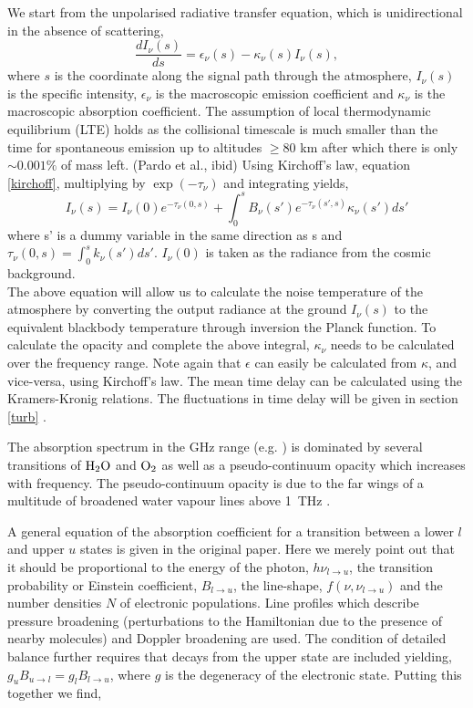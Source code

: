 We start from the unpolarised radiative transfer equation, which is unidirectional in the absence of scattering,
\begin{equation}
\frac{dI_\nu (s) }{ds} = \epsilon_\nu(s) -\kappa_\nu(s)  I_\nu (s),
\end{equation}\label{eq:rad_trans}
where $s$ is the coordinate along the signal path through the atmosphere, $I_\nu(s)$ is the specific intensity, $\epsilon_\nu$ is the macroscopic emission coefficient and $\kappa_\nu$ is the macroscopic absorption coefficient.  The assumption of local thermodynamic equilibrium (LTE) holds as the collisional timescale is much smaller than the time for spontaneous emission up to altitudes $\ge 80$ km after which there is only $\sim 0.001\%$ of mass left. (Pardo et al., ibid) Using Kirchoff's law, equation \ref{kirchoff}, multiplying by $\exp(-\tau_\nu)$ and integrating yields, 
\begin{equation}
I_\nu(s) = I_\nu(0) e^{-\tau_\nu (0,s) }+ \int_0^s B_\nu(s')e^{-\tau_\nu (s',s) }\kappa_\nu(s')ds'
\end{equation}
where  s' is a dummy variable in the same direction as s and $\tau_\nu (0,s) = \int_0^{s} k_\nu(s')ds'$. $I_\nu(0)$ is taken as the radiance from the cosmic background.\\
The above equation will allow us to calculate the noise temperature of the atmosphere by converting the output radiance at the ground $I_\nu(s)$ to  the equivalent blackbody temperature through inversion the Planck function. To calculate the opacity and complete the above integral, $\kappa_\nu$ needs to be calculated over the frequency range. Note again that  $\epsilon$ can easily be calculated from $\kappa$, and vice-versa, using Kirchoff's law.  The mean time delay can be calculated using the Kramers-Kronig relations. The fluctuations in time delay will be given in section \ref{turb} .

The absorption spectrum in the GHz range (e.g. \citealt{Pardo_2001}) is dominated by several transitions of $\rm H_2O$ and $\rm O_2$ as well as a pseudo-continuum opacity which increases with frequency. The pseudo-continuum opacity is due to the far wings of a multitude of broadened water vapour lines above 1~THz \citep{Carilli_1999}. 


A general equation of the absorption coefficient for a transition between a lower $l$ and upper $u$ states is given in the original paper. Here we merely point out that it should be proportional to the energy of the photon, $h\nu_{l \to u}$, the transition probability or Einstein coefficient, $ B_{l \to u}$, the line-shape, $f(\nu,\nu_{l \to u})$ and the number densities $N$ of electronic populations. Line profiles which describe pressure broadening (perturbations to the Hamiltonian due to the presence of nearby molecules) and Doppler broadening are used. The condition of detailed balance further requires that decays from the upper state are included yielding, $g_u B_{u \to l} =g_l B_{l \to u}$, where $g$ is the degeneracy of the electronic state. Putting this together we find,

